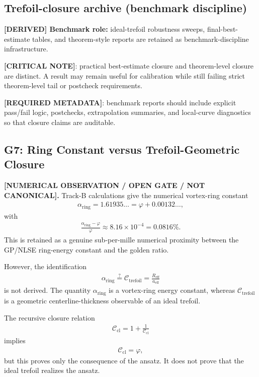 \subsection{Trefoil-closure archive (benchmark discipline)}
\textbf{[DERIVED] Benchmark role:} ideal-trefoil robustness sweeps, final-best-estimate tables, and theorem-style reports are retained as benchmark-discipline infrastructure.

\textbf{[CRITICAL NOTE]}: practical best-estimate closure and theorem-level closure are distinct.
A result may remain useful for calibration while still failing strict theorem-level tail or postcheck requirements.

\textbf{[REQUIRED METADATA]}: benchmark reports should include explicit pass/fail logic, postchecks, extrapolation summaries, and local-curve diagnostics so that closure claims are auditable.

\subsection{G7: Ring Constant versus Trefoil-Geometric Closure}
\label{subsec:g7_ring_constant_vs_trefoil_closure}

\textbf{[NUMERICAL OBSERVATION / OPEN GATE / NOT CANONICAL].}
Track-B calculations give the numerical vortex-ring constant
\begin{align}
    \alpha_{\mathrm{ring}}
    =
    1.61935\ldots
    =
    \varphi + 0.00132\ldots ,
\end{align}
with
\begin{align}
    \frac{\alpha_{\mathrm{ring}}-\varphi}{\varphi}
    \approx
    8.16\times 10^{-4}
    =
    0.0816\%.
\end{align}
This is retained as a genuine sub-per-mille numerical proximity between the
GP/NLSE ring-energy constant and the golden ratio.

However, the identification
\begin{align}
    \alpha_{\mathrm{ring}}
    \stackrel{?}{=}
    \mathcal{C}_{\mathrm{trefoil}}
    =
    \frac{R_{\mathrm{eff}}}{a_{\mathrm{eff}}}
\end{align}
is not derived. The quantity \(\alpha_{\mathrm{ring}}\) is a vortex-ring
energy constant, whereas \(\mathcal{C}_{\mathrm{trefoil}}\) is a geometric
centerline-thickness observable of an ideal trefoil.

The recursive closure relation
\begin{align}
    \mathcal{C}_{\mathrm{cl}}
    =
    1+\frac{1}{\mathcal{C}_{\mathrm{cl}}}
\end{align}
implies
\begin{align}
    \mathcal{C}_{\mathrm{cl}}=\varphi,
\end{align}
but this proves only the consequence of the ansatz. It does not prove that
the ideal trefoil realizes the ansatz.

